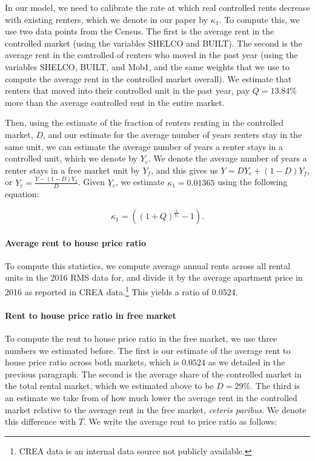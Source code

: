 \documentclass[parskip=full]{article}
\begin{document}
In our model, we need to calibrate the rate at which real controlled rents decrease  with existing renters, which we denote in our paper by $\kappa_{1}$. To compute this, we use two data points from the Census. The first is the average rent in the controlled market (using the variables SHELCO and BUILT). The second is the average rent in the controlled of renters who moved in the past year (using the variables SHELCO, BUILT, and Mob1, and the same weights that we use to compute the average rent in the controlled market overall). We estimate that renters that moved into their controlled unit in the past year, pay $Q=13.84\%$ more than the average controlled rent in the entire market. 

Then, using the estimate of the fraction of renters renting in the controlled market, $D$, and our estimate for the average number of years renters stay in the same unit, we can estimate the average number of years a renter stays in a controlled unit, which we denote by $Y_{c}$. We denote the average number of years a renter stays in a free market unit by $Y_{f}$, and this gives us $Y=D Y_{c}+(1-D)Y_{f}$, or $Y_{c}=\frac{Y-(1-D)Y_{f}}{D}$. Given $Y_{c}$, we estimate $\kappa_{1}=0.01365$ using the following equation: 

\begin{equation}\label{eq:computing_annual_decrease}
    \kappa_{1}=((1+Q)^{\frac{1}{Y_{c}}}-1).
\end{equation}

\paragraph{Average rent to house price ratio}

To compute this statistics, we compute average annual rents across all rental units in the 2016 RMS data for, and divide it by the average apartment price in 2016 as reported in CREA data.\footnote{CREA data is an internal data source not publicly available.} This yields a ratio of $0.0524$.

\paragraph{Rent to house price ratio in free market}

To compute the rent to house price ratio in the free market, we use three numbers we estimated before. The first is our estimate of the average rent to house price ratio across both markets, which is $0.0524$ as we detailed in the previous paragraph. The second is the average share of the controlled market in the total rental market, which we estimated above to be $D=29\%$. The third is an estimate we take from \citet{zhang-gou} of how much lower the average rent in the controlled market relative to the average rent in the free market, \textsl{ceteris paribus}. 
We denote this difference with $T$. We write the average rent to price ratio as follows:
\end{document}
